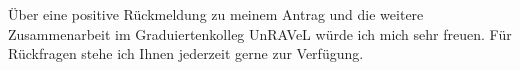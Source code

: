 


Über eine positive Rückmeldung zu meinem Antrag und die weitere Zusammenarbeit im Graduiertenkolleg UnRAVeL würde ich mich sehr freuen.
Für Rückfragen stehe ich Ihnen jederzeit gerne zur Verfügung.
